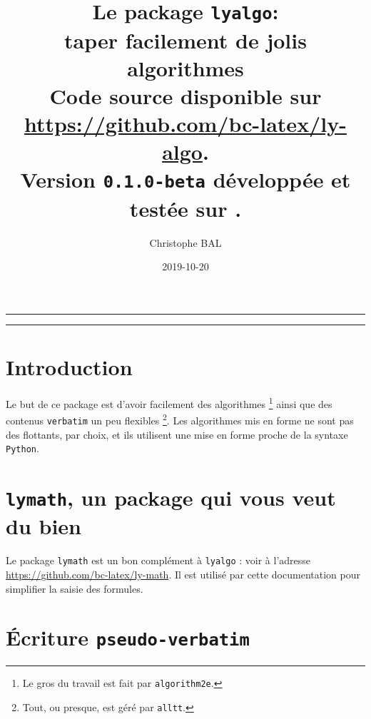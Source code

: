 \documentclass[12pt,a4paper]{article}
\theoremstyle{definition}
\begin{document}
\renewcommand\labelitemi{\raisebox{0.125em}{\tiny\textbullet}}
\renewcommand{\labelitemii}{---}

\title{%
	Le package \texttt{lyalgo}:
	\\
	taper facilement de jolis algorithmes
	\\
	{
		\footnotesize Code source disponible
		sur \url{https://github.com/bc-latex/ly-algo}.%
	}
	\\
	{
		\footnotesize Version \texttt{0.1.0-beta}
		développée et testée sur \macosxname{}.%
	}
}

\author{Christophe BAL}
\date{2019-10-20}

\maketitle


\vspace{2em}

\hrule

\tableofcontents

\vspace{1.5em}

\hrule

\newpage



\section{Introduction}

Le but de ce package est d'avoir facilement des algorithmes
\footnote{
	Le gros du travail est fait par \texttt{algorithm2e}.
}
ainsi que des contenus \verb+verbatim+ un peu flexibles
\footnote{
	Tout, ou presque, est géré par \texttt{alltt}.
}.
Les algorithmes mis en forme ne sont pas des flottants, par choix, et ils utilisent une mise en forme proche de la syntaxe \verb+Python+.




\section{\texttt{lymath}, un package qui vous veut du bien}

Le package \verb+lymath+ est un bon complément à \verb+lyalgo+ : voir à l'adresse \url{https://github.com/bc-latex/ly-math}. 
Il est utilisé par cette documentation pour simplifier la saisie des formules.




\section{Écriture \texttt{pseudo-verbatim}}
\end{document}
